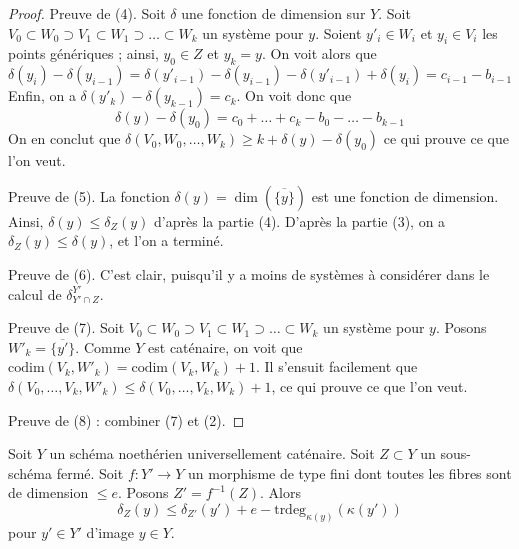 \begin{proof}
\medskip\noindent
Preuve de (4). Soit $\delta$ une fonction de dimension sur $Y$.
Soit $V_0 \subset W_0 \supset V_1 \subset W_1 \supset \ldots \subset W_k$
un système pour $y$. Soient $y'_i \in W_i$ et $y_i \in V_i$ les
points génériques ; ainsi, $y_0 \in Z$ et $y_k = y$. On voit alors que
$$
\delta(y_i) - \delta(y_{i - 1}) =
\delta(y'_{i - 1}) - \delta(y_{i - 1}) - \delta(y'_{i - 1}) + \delta(y_i) =
c_{i - 1} - b_{i - 1}
$$
Enfin, on a $\delta(y'_k) - \delta(y_{k - 1}) = c_k$.
On voit donc que
$$
\delta(y) - \delta(y_0) =
c_0 + \ldots + c_k - b_0 - \ldots - b_{k - 1}
$$
On en conclut que
$\delta(V_0, W_0, \ldots, W_k) \geq k + \delta(y) - \delta(y_0)$
ce qui prouve ce que l'on veut.

\medskip\noindent
Preuve de (5). La fonction $\delta(y) = \dim(\overline{\{y\}})$
est une fonction de dimension. Ainsi, $\delta(y) \leq \delta_Z(y)$ d'après la
partie (4). D'après la partie (3), on a $\delta_Z(y) \leq \delta(y)$,
et l'on a terminé.

\medskip\noindent
Preuve de (6). C'est clair, puisqu'il y a moins de systèmes à considérer
dans le calcul de $\delta^{Y'}_{Y' \cap Z}$.

\medskip\noindent
Preuve de (7). Soit
$V_0 \subset W_0 \supset V_1 \subset W_1 \supset \ldots \subset W_k$
un système pour $y$. Posons $W'_k = \overline{\{y'\}}$.
Comme $Y$ est caténaire, on voit que
$\text{codim}(V_k, W'_k) = \text{codim}(V_k, W_k) + 1$.
Il s'ensuit facilement que $\delta(V_0, \ldots, V_k, W'_k) \leq
\delta(V_0, \ldots, V_k, W_k) + 1$, ce qui prouve ce que l'on veut.

\medskip\noindent
Preuve de (8) : combiner (7) et (2).
\end{proof}

\begin{lemma}
\label{lemma-change-distance-function}
Soit $Y$ un schéma noethérien universellement caténaire. Soit $Z \subset Y$
un sous-schéma fermé. Soit $f : Y' \to Y$ un morphisme de type fini
dont toutes les fibres sont de dimension $\leq e$. Posons $Z' = f^{-1}(Z)$.
Alors
$$
\delta_Z(y) \leq \delta_{Z'}(y') + e - \text{trdeg}_{\kappa(y)}(\kappa(y'))
$$
pour $y' \in Y'$ d'image $y \in Y$.
\end{lemma}

